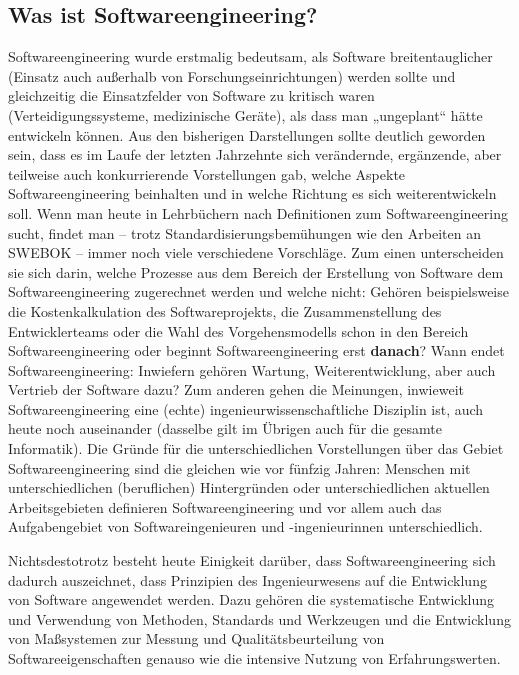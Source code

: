 \subsection{Was ist Softwareengineering?}
\label{sec:Kap-1.2.1}

Softwareengineering wurde erstmalig bedeutsam, als Software breitentauglicher (Einsatz auch außerhalb von Forschungseinrichtungen) werden sollte und gleichzeitig die Einsatzfelder von Software zu kritisch waren (\zb Verteidigungssysteme, medizinische Geräte), als dass man „ungeplant“ hätte entwickeln können. Aus den bisherigen Darstellungen sollte deutlich geworden sein, dass es im Laufe der letzten Jahrzehnte sich verändernde, ergänzende, aber teilweise auch konkurrierende Vorstellungen gab, welche Aspekte Softwareengineering beinhalten und in welche Richtung es sich weiterentwickeln soll. Wenn man heute in Lehrbüchern nach Definitionen zum Softwareengineering sucht, findet man -- trotz Standardisierungsbemühungen wie den Arbeiten an SWEBOK -- immer noch viele verschiedene Vorschläge. Zum einen unterscheiden sie sich darin, welche Prozesse aus dem Bereich der Erstellung von Software dem Softwareengineering zugerechnet werden und welche nicht: Gehören beispielsweise die Kostenkalkulation des Softwareprojekts, die Zusammenstellung des Entwicklerteams oder die Wahl des Vorgehensmodells schon in den Bereich Softwareengineering oder beginnt Softwareengineering erst \textbf{danach}? Wann endet Softwareengineering: Inwiefern gehören Wartung, Weiterentwicklung, aber auch Vertrieb der Software dazu? Zum anderen gehen die Meinungen, inwieweit Softwareengineering eine (echte) ingenieurwissenschaftliche Disziplin ist, auch heute noch auseinander (dasselbe gilt im Übrigen auch für die gesamte Informatik). Die Gründe für die unterschiedlichen Vorstellungen über das Gebiet Softwareengineering sind die gleichen wie vor fünfzig Jahren: Menschen mit unterschiedlichen (beruflichen) Hintergründen oder unterschiedlichen aktuellen Arbeitsgebieten definieren Softwareengineering und vor allem auch das Aufgabengebiet von Softwareingenieuren und -ingenieurinnen unterschiedlich.

Nichtsdestotrotz
besteht heute Einigkeit darüber, dass Softwareengineering sich dadurch auszeichnet, dass Prinzipien des Ingenieurwesens auf die Entwicklung von Software angewendet werden. Dazu gehören die systematische Entwicklung und Verwendung von Methoden, Standards und Werkzeugen und die Entwicklung von Maßsystemen zur Messung und Qualitätsbeurteilung von Softwareeigenschaften genauso wie die intensive Nutzung von Erfahrungswerten.

